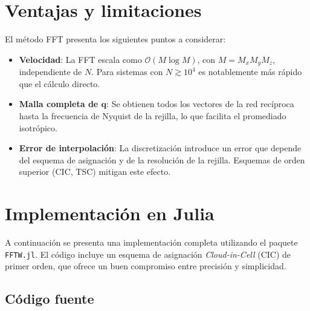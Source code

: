 \documentclass[justified, notoc]{tufte-handout}
\begin{document}
\section{Ventajas y limitaciones}\label{sec:ventajas}

El método FFT presenta los siguientes puntos a considerar:

\begin{itemize}
    \item \textbf{Velocidad}: La FFT escala como $\mathcal{O}(M\log M)$, con $M = M_x M_y M_z$, independiente de $N$. Para sistemas con $N \gtrsim 10^4$ es notablemente más rápido que el cálculo directo.
    \item \textbf{Malla completa de $\mathbf{q}$}: Se obtienen todos los vectores de la red recíproca hasta la frecuencia de Nyquist de la rejilla, lo que facilita el promediado isotrópico.
    \item \textbf{Error de interpolación}: La discretización introduce un error que depende del esquema de asignación y de la resolución de la rejilla. Esquemas de orden superior (CIC, TSC) mitigan este efecto.
\end{itemize}

\section{Implementación en Julia}\label{sec:implementacion}

A continuación se presenta una implementación completa utilizando el paquete \texttt{FFTW.jl}. El código incluye un esquema de asignación \textit{Cloud-in-Cell} (CIC) de primer orden, que ofrece un buen compromiso entre precisión y simplicidad.

\subsection*{Código fuente}
\end{document}
